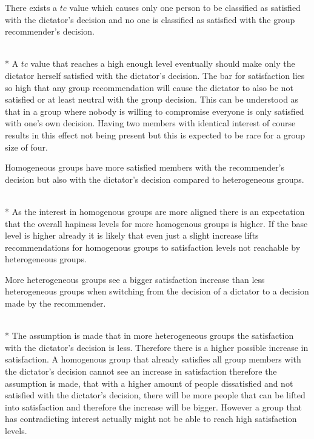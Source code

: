 \begin{hypothesis}
    \begin{itshape}
        \label{hyp:Evaluation:OnlyOneSatisfied} There exists a $tc$ value which causes only one person to be classified as satisfied with the dictator's decision and no one is classified as satisfied with the group recommender's decision.
    \end{itshape} \medskip \\*
    A $tc$ value that reaches a high enough level eventually should make only the dictator herself satisfied with the dictator's decision. The bar for satisfaction lies so high that any group recommendation will cause the dictator to also be not satisfied or at least neutral with the group decision. This can be understood as that in a group where nobody is willing to compromise everyone is only satisfied with one's own decision. Having two members with identical interest of course results in this effect not being present but this is expected to be rare for a group size of four. 
\end{hypothesis}

\begin{hypothesis}
    \begin{itshape}
        \label{hyp:Evaluation:HomogenousMoreSatisfied} Homogeneous groups have more satisfied members with the recommender's decision but also with the dictator's decision compared to heterogeneous groups.
    \end{itshape} \medskip \\*
    As the interest in homogenous groups are more aligned there is an expectation that the overall hapiness levels for more homogenous groups is higher. If the base level is higher already it is likely that even just a slight increase lifts recommendations for homogenous groups to satisfaction levels not reachable by heterogeneous groups.
\end{hypothesis}

\begin{hypothesis}
    \begin{itshape}
        \label{hyp:Evaluation:HeterogenousBiggerSatisfactionIncrease} More heterogeneous groups see a bigger satisfaction increase than less heterogeneous groups when switching from the decision of a dictator to a decision made by the recommender.
    \end{itshape} \medskip \\*
    The assumption is made that in more heterogeneous groups the satisfaction with the dictator's decision is less. Therefore there is a higher possible increase in satisfaction. A homogenous group that already satisfies all group members with the dictator's decision cannot see an increase in satisfaction therefore the assumption is made, that with a higher amount of people dissatisfied and not satisfied with the dictator's decision, there will be more people that can be lifted into satisfaction and therefore the increase will be bigger. However a group that has contradicting interest actually might not be able to reach high satisfaction levels.
\end{hypothesis}

